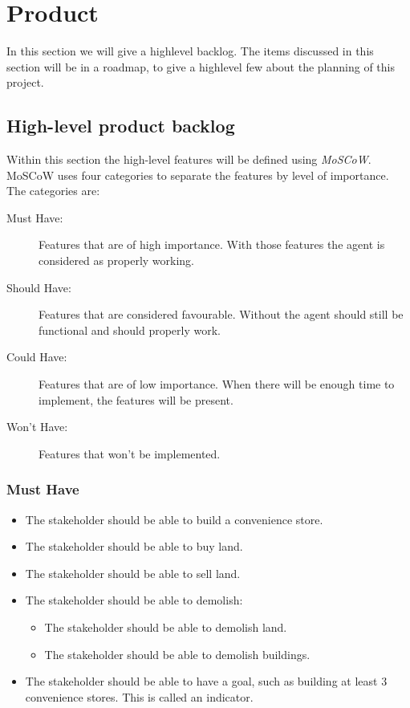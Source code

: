\label{product}
\section{Product}
In this section we will give a highlevel backlog. The items discussed in this section will be in a roadmap, to give a highlevel few about the planning of this project.
\subsection{High-level product backlog}

Within this section the high-level features will be defined using \textit{MoSCoW}. MoSCoW uses four categories to separate the features by level of importance. The categories are:

\begin{description}
	\item[Must Have:] Features that are of high importance. With those features the agent is considered as properly working.
	\item[Should Have:] Features that are considered favourable. Without the agent should still be functional and should properly work.
	\item[Could Have:] Features that are of low importance. When there will be enough time to implement, the features will be present.
	\item[Won't Have:] Features that won't be implemented.
\end{description}

\subsubsection{Must Have}
\begin{itemize}
	\item The stakeholder should be able to build a convenience store.
	\item The stakeholder should be able to buy land.
	\item The stakeholder should be able to sell land.
	\item The stakeholder should be able to demolish:
		\begin{itemize}
			\item The stakeholder should be able to demolish land.
			\item The stakeholder should be able to demolish buildings.
		\end{itemize}
	\item The stakeholder should be able to have a goal, such as building at least 3 convenience stores. This is called an indicator.
\end{itemize}

